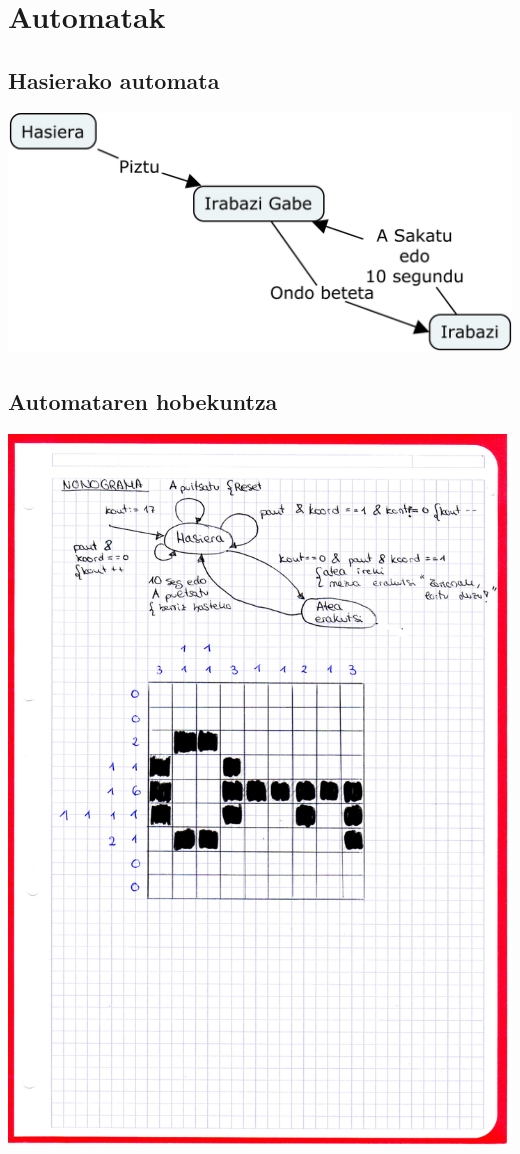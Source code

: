 \documentclass[dvipsnames]{AritzhClass}
\begin{document}
\section{Automatak}
\subsection{Hasierako automata}
\begin{center}
\includegraphics[scale=0.4]{Nonograma_Mapa}
\end{center}
\subsection{Automataren hobekuntza}
\begin{center}
\includegraphics[scale=0.4]{img003}
\end{center}
\end{document}
